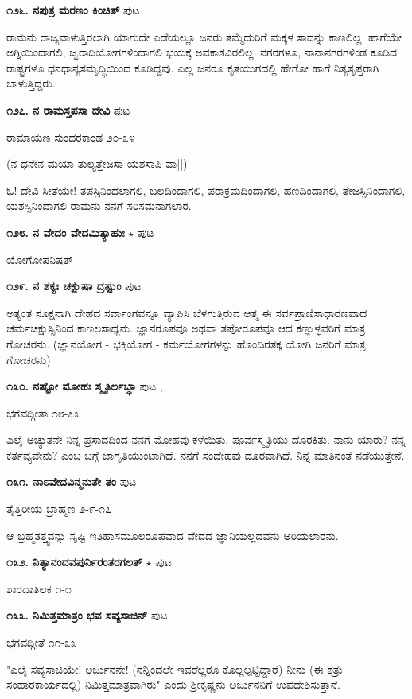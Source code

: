 \medskip
\noindent\textbf{೧೨೬. ನಪುತ್ರ ಮರಣಂ ಕಿಂಚಿತ್} \hfill ಪುಟ \pageref{180}

ರಾಮನು ರಾಜ್ಯವಾಳುತ್ತಿರಲಾಗಿ ಯಾಗುದೇ ಎಡೆಯಲ್ಲೂ ಜನರು ತಮ್ಮೆದುರಿಗೆ ಮಕ್ಕಳ ಸಾವನ್ನು ಕಾಣಲಿಲ್ಲ. ಹಾಗೆಯೇ ಅಗ್ನಿಯಿಂದಾಗಲಿ, ಜ್ವರಾದಿಯೋಗಗಳಿಂದಾಗಲಿ ಭಯಕ್ಕೆ ಅವಕಾಶವಿರಲಿಲ್ಲ. ನಗರಗಳೂ, ನಾನಾನಗರಗಳಿಂಡ ಕೂಡಿದ ರಾಷ್ಟ್ರಗಳೂ ಧನಧಾನ್ಯಸಮೃದ್ಧಿಯಿಂದ ಕೂಡಿದ್ದವು. ಎಲ್ಲ ಜನರೂ ಕೃತಯುಗದಲ್ಲಿ ಹೇಗೋ ಹಾಗೆ ನಿತ್ಯತೃಪ್ತರಾಗಿ ಬಾಳುತ್ತಿದ್ದರು.

\medskip
\noindent\textbf{೧೨೭. ನ ರಾಮಸ್ತಪಸಾ ದೇವಿ} \hfill ಪುಟ \pageref{191}

\hfill ರಾಮಾಯಣ ಸುಂದರಕಾಂಡ ೨೦-೩೪

(ನ ಧನೇನ ಮಯಾ ತುಲ್ಯತ್ತೇಜಸಾ ಯಶಸಾಪಿ ವಾ||)

ಓ! ದೇವಿ ಸೀತೆಯೇ! ತಪಸ್ಸಿನಿಂದಲಾಗಲಿ, ಬಲದಿಂದಾಗಲಿ, ಪರಾಕ್ರಮದಿಂದಾಗಲಿ, ಹಣದಿಂದಾಗಲಿ, ತೇಜಸ್ಸಿನಿಂದಾಗಲಿ, ಯಶಸ್ಸಿನಿಂದಾಗಲಿ ರಾಮನು ನನಗೆ ಸರಿಸಮನಾಗಲಾರ. 

\medskip
\noindent\textbf{೧೨೮. ನ ವೇದಂ ವೇದಮಿತ್ಯಾಹುಃ}  $\star$ \hfill ಪುಟ \pageref{13c}

\hfill ಯೋಗೋಪನಿಷತ್

\medskip
\noindent\textbf{೧೨೯. ನ ಶಕ್ಯಃ ಚಕ್ಷುಷಾ ದ್ರಷ್ಟುಂ} \hfill ಪುಟ \pageref{246}

ಅತ್ಯಂತ ಸೂಕ್ಷನಾಗಿ ದೇಹದ ಸರ್ವಾಂಗವನ್ನೂ ವ್ಯಾಪಿಸಿ ಬೆಳಗುತ್ತಿರುವ ಆತ್ಮ ಈ ಸರ್ವಪ್ರಾಣಿಸಾಧಾರಣವಾದ ಚರ್ಮಚಕ್ಷುಸ್ಸಿನಿಂದ ಕಾಣಲಸಾಧ್ಯನು. ಜ್ಞಾನರೂಪವೂ ಅಥವಾ ತಪೋರೂಪವೂ ಆದ ಕಣ್ಣುಳ್ಳವರಿಗೆ ಮಾತ್ರ ಗೋಚರನು. (ಜ್ಞಾನಯೋಗ - ಭಕ್ತಿಯೋಗ - ಕರ್ಮಯೋಗಗಳನ್ನು ಹೊಂದಿರತಕ್ಕ ಯೋಗಿ ಜನರಿಗೆ ಮಾತ್ರ ಗೋಚರನು)

\medskip
\noindent\textbf{೧೩೦. ನಷ್ಟೋ ಮೋಹಃ ಸ್ಮೃತಿರ್ಲಬ್ಧಾ} \hfill ಪುಟ \pageref{91},\pageref{104}

\hfill ಭಗವದ್ಗೀತಾ ೧೮-೭೩

ಎಲೈ ಅಚ್ಯುತನೇ ನಿನ್ನ ಪ್ರಸಾದದಿಂದ ನನಗೆ ಮೋಹವು ಕಳೆಯಿತು. ಪೂರ್ವಸ್ಮೃತಿಯು ದೊರಕಿತು. ನಾನು ಯಾರು? ನನ್ನ ಕರ್ತವ್ಯವೇನು? ಎಂಬ ಬಗ್ಗೆ ಜಾಗೃತಿಯುಂಟಾಗಿದೆ. ನನಗೆ ಸಂದೇಹವು ದೂರವಾಗಿದೆ. ನಿನ್ನ ಮಾತಿನಂತೆ ನಡೆಯುತ್ತೇನೆ.

\medskip
\noindent\textbf{೧೩೧. ನಾಽವೇದವಿನ್ಮನುತೇ ತಂ} \hfill ಪುಟ \pageref{106}

\hfill ತೈತ್ತಿರೀಯ ಬ್ರಾಹ್ಮಣ ೨-೯-೧೭

ಆ ಬ್ರಹ್ಮತತ್ತ್ವವನ್ನು ಸೃಷ್ಟಿ ಇತಿಹಾಸಮೂಲರೂಪವಾದ  ವೇದದ ಜ್ಞಾನಿಯಲ್ಲದವನು ಅರಿಯಲಾರನು.

\medskip
\noindent\textbf{೧೩೨. ನಿತ್ಯಾನಂದವಪುರ್ನಿರಂತರಗಲತ್} $\star$ \hfill ಪುಟ \pageref{31}

\hfill ಶಾರದಾತಿಲಕ ೧-೧

\medskip
\noindent\textbf{೧೩೩. ನಿಮಿತ್ತಮಾತ್ರಂ ಭವ ಸವ್ಯಸಾಚಿನ್} \hfill ಪುಟ \pageref{214a}

\hfill ಭಗವದ್ಗೀತೆ ೧೧-೩೩

"ಎಲೈ ಸವ್ಯಸಾಚಿಯೇ! ಅರ್ಜುನನೇ! (ನನ್ನಿಂದಲೇ ಇವರೆಲ್ಲರೂ ಕೊಲ್ಲಲ್ಪಟ್ಟಿದ್ದಾರೆ) ನೀನು (ಈ ಶತ್ರು ಸಂಹಾರಕಾರ್ಯದಲ್ಲಿ) ನಿಮಿತ್ತಮಾತ್ರವಾಗಿರು" ಎಂದು ಶ್ರೀಕೃಷ್ಣನು ಅರ್ಜುನನಿಗೆ ಉಪದೇಶಿಸುತ್ತಾನೆ.

